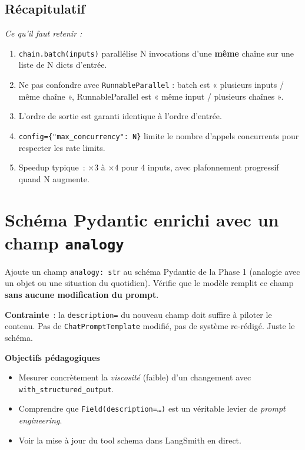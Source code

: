 \documentclass[11pt,a4paper]{article}
\begin{document}
\subsection*{Récapitulatif}
{\itshape\sloppy
\textit{Ce qu'il faut retenir :}
\begin{enumerate}[leftmargin=*]
  \item \texttt{chain.batch(inputs)} parallélise N invocations d'une
        \textbf{même} chaîne sur une liste de N dicts d'entrée.
  \item Ne pas confondre avec \texttt{RunnableParallel} : batch est
        « plusieurs inputs / même chaîne », RunnableParallel est
        « même input / plusieurs chaînes ».
  \item L'ordre de sortie est garanti identique à l'ordre d'entrée.
  \item \texttt{config=\{"max\_concurrency": N\}} limite le nombre
        d'appels concurrents pour respecter les rate limits.
  \item Speedup typique~: $\times 3$ à $\times 4$ pour 4 inputs, avec
        plafonnement progressif quand N augmente.
\end{enumerate}
\par}

\section{Schéma Pydantic enrichi avec un champ \texttt{analogy}}

\begin{tcolorbox}[title=Exercice bonus 3. Étendre un schéma Pydantic sans toucher au prompt]
Ajoute un champ \texttt{analogy: str} au schéma Pydantic de la Phase 1
(analogie avec un objet ou une situation du quotidien). Vérifie que le
modèle remplit ce champ \textbf{sans aucune modification du prompt}.

\textbf{Contrainte}~: la \texttt{description=} du nouveau champ doit
suffire à piloter le contenu. Pas de \texttt{ChatPromptTemplate} modifié,
pas de système re-rédigé. Juste le schéma.

\bigskip
\noindent\textbf{Objectifs pédagogiques}
\begin{itemize}[leftmargin=*]
  \item Mesurer concrètement la \emph{viscosité} (faible) d'un changement
        avec \texttt{with\_structured\_output}.
  \item Comprendre que \texttt{Field(description=\dots)} est un véritable
        levier de \emph{prompt engineering}.
  \item Voir la mise à jour du tool schema dans LangSmith en direct.
\end{itemize}
\end{tcolorbox}
\end{document}
